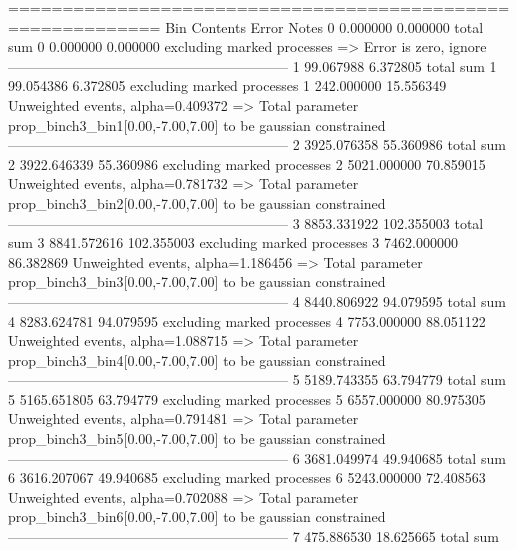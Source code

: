 ============================================================
Bin        Contents        Error           Notes                         
0          0.000000        0.000000        total sum                     
0          0.000000        0.000000        excluding marked processes    
  => Error is zero, ignore      
------------------------------------------------------------
1          99.067988       6.372805        total sum                     
1          99.054386       6.372805        excluding marked processes    
1          242.000000      15.556349       Unweighted events, alpha=0.409372
  => Total parameter prop_binch3_bin1[0.00,-7.00,7.00] to be gaussian constrained
------------------------------------------------------------
2          3925.076358     55.360986       total sum                     
2          3922.646339     55.360986       excluding marked processes    
2          5021.000000     70.859015       Unweighted events, alpha=0.781732
  => Total parameter prop_binch3_bin2[0.00,-7.00,7.00] to be gaussian constrained
------------------------------------------------------------
3          8853.331922     102.355003      total sum                     
3          8841.572616     102.355003      excluding marked processes    
3          7462.000000     86.382869       Unweighted events, alpha=1.186456
  => Total parameter prop_binch3_bin3[0.00,-7.00,7.00] to be gaussian constrained
------------------------------------------------------------
4          8440.806922     94.079595       total sum                     
4          8283.624781     94.079595       excluding marked processes    
4          7753.000000     88.051122       Unweighted events, alpha=1.088715
  => Total parameter prop_binch3_bin4[0.00,-7.00,7.00] to be gaussian constrained
------------------------------------------------------------
5          5189.743355     63.794779       total sum                     
5          5165.651805     63.794779       excluding marked processes    
5          6557.000000     80.975305       Unweighted events, alpha=0.791481
  => Total parameter prop_binch3_bin5[0.00,-7.00,7.00] to be gaussian constrained
------------------------------------------------------------
6          3681.049974     49.940685       total sum                     
6          3616.207067     49.940685       excluding marked processes    
6          5243.000000     72.408563       Unweighted events, alpha=0.702088
  => Total parameter prop_binch3_bin6[0.00,-7.00,7.00] to be gaussian constrained
------------------------------------------------------------
7          475.886530      18.625665       total sum                     
